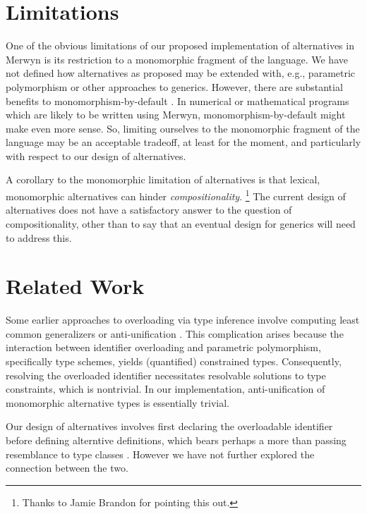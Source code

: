 \documentclass{article}
\renewcommand{\=}{\triangleq}
\begin{document}
\section{Limitations}

One of the obvious limitations of
our proposed implementation of alternatives in Merwyn is its restriction to
a monomorphic fragment of the language.
We have not defined how alternatives as proposed may be extended with,
e.g., parametric polymorphism or other approaches to generics.
However, there are substantial benefits to monomorphism-by-default
\cite{vytiniotis10}.
In numerical or mathematical programs which are likely to be written using
Merwyn,
monomorphism-by-default might make even more sense.
So, limiting ourselves to the monomorphic fragment of the language may be
an acceptable tradeoff, at least for the moment,
and particularly with respect to our design of alternatives.

A corollary to the monomorphic limitation of alternatives is that
lexical, monomorphic alternatives can hinder \emph{compositionality}.%
\footnote{Thanks to Jamie Brandon for pointing this out.}
The current design of alternatives does not have a satisfactory answer to
the question of compositionality, other than to say that an eventual design
for generics will need to address this.

\section{Related Work}

Some earlier approaches to overloading via type inference involve computing
least common generalizers or anti-unification
\cite{smith94,camarao99}.
This complication arises because the interaction between identifier overloading
and parametric polymorphism, specifically type schemes,
yields (quantified) constrained types.
Consequently, resolving the overloaded identifier necessitates resolvable
solutions to type constraints, which is nontrivial.
In our implementation,
anti-unification of monomorphic alternative types is essentially trivial.

Our design of alternatives involves first declaring the overloadable
identifier before defining alterntive definitions,
which bears perhaps a more than passing resemblance to type classes
\cite{wadler89}.
However we have not further explored the connection between the two.



\end{document}
